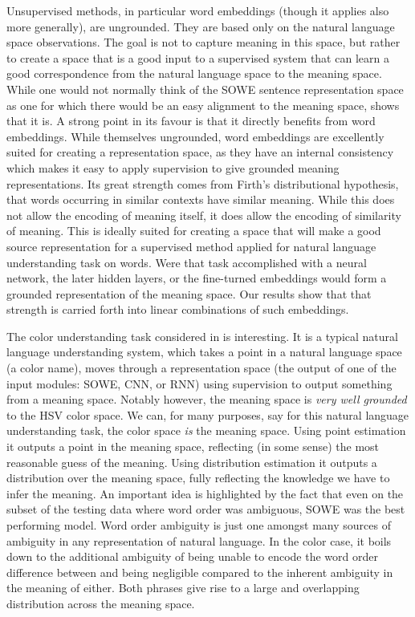\documentclass{book}
\begin{document}
Unsupervised methods, in particular word embeddings (though it applies also more generally), are ungrounded.
They are based only on the natural language space observations.
The goal is not to capture meaning in this space,
but rather to create a space that is a good input to a supervised system that can learn a good correspondence from the natural language space to the meaning space. 
While one would not normally think of the SOWE sentence representation space as one for which there would be an easy alignment to the meaning space,
 shows that it is.
A strong point in its favour is that it directly benefits from word embeddings.
While themselves ungrounded, word embeddings are excellently suited for creating a representation space, as they have an internal consistency which makes it easy to apply supervision to give grounded meaning representations.
Its great strength comes from Firth's distributional hypothesis, that words occurring in similar contexts have similar meaning.
While this does not allow the encoding of meaning itself, it does allow the encoding of similarity of meaning.
This is ideally suited for creating a space that will make a good source representation for a supervised method applied for natural language understanding task on words.
Were that task accomplished with a neural network, the later hidden layers, or the fine-turned embeddings would form a grounded representation of the meaning space.
Our results show that that strength is carried forth into linear combinations of such embeddings.


The color understanding task considered in  is interesting.
It is a typical natural language understanding system,
which takes a point in a natural language space (a color name),
moves through a representation space (the output of one of the input modules: SOWE, CNN, or RNN) using supervision to output something from a meaning space.
Notably however, the meaning space is \emph{very well grounded} to the HSV color space.
We can, for many purposes, say for this natural language understanding task, the color space \emph{is} the meaning space.
Using point estimation it outputs a point in the meaning space, reflecting (in some sense) the most reasonable guess of the meaning.
Using distribution estimation it outputs a distribution over the meaning space, fully reflecting the knowledge we have to infer the meaning.
An important idea is highlighted by the fact that even on the subset of the testing data where word order was ambiguous, SOWE was the best performing model.
Word order ambiguity is just one amongst many sources of ambiguity in any representation of natural language.
In the color case, it boils down to the additional ambiguity of being unable to encode the word order difference between  and  being negligible compared to the inherent ambiguity in the meaning of either.
Both phrases give rise to a large and overlapping distribution across the meaning space.
\end{document}
